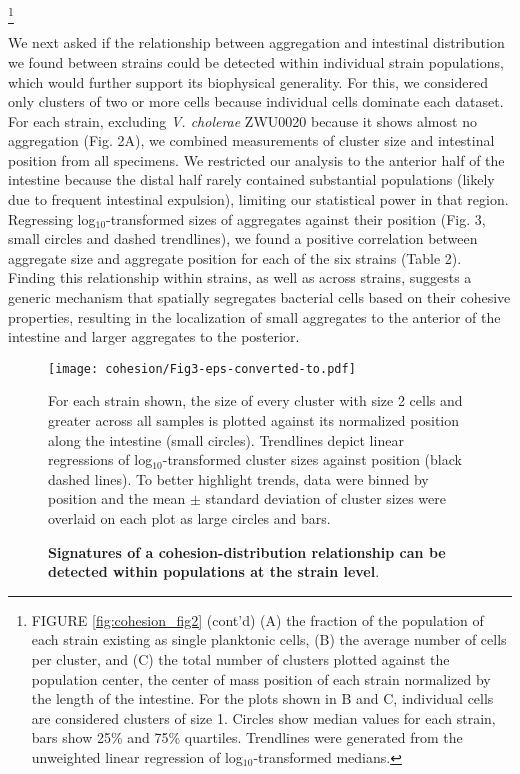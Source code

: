 {\let\thefootnote\relax\footnote{FIGURE \ref{fig:cohesion_fig2} (cont'd) (A) the fraction of the population of each strain existing as single planktonic cells, (B) the average number of cells per cluster, and (C) the total number of clusters plotted against the population center, the center of mass position of each strain normalized by the length of the intestine. For the plots shown in B and C, individual cells are considered clusters of size 1. Circles show median values for each strain, bars show 25\% and 75\% quartiles. Trendlines were generated from the unweighted linear regression of log$_{10}$-transformed medians.}

We next asked if the relationship between aggregation and intestinal distribution we found between strains could be detected within individual strain populations, which would further support its biophysical generality. For this, we considered only clusters of two or more cells because individual cells dominate each dataset. For each strain, excluding \textit{V. cholerae} ZWU0020 because it shows almost no aggregation (Fig. 2A), we combined measurements of cluster size and intestinal position from all specimens. We restricted our analysis to the anterior half of the intestine because the distal half rarely contained substantial populations (likely due to frequent intestinal expulsion), limiting our statistical power in that region. Regressing log$_{10}$-transformed sizes of aggregates against their position (Fig. 3, small circles and dashed trendlines), we found a positive correlation between aggregate size and aggregate position for each of the six strains (Table 2). Finding this relationship within strains, as well as across strains, suggests a generic mechanism that spatially segregates bacterial cells based on their cohesive properties, resulting in the localization of small aggregates to the anterior of the intestine and larger aggregates to the posterior.


\begin{figure}%
	\centerline{
		\texttt{[image: cohesion/Fig3-eps-converted-to.pdf]}}
	\caption{\textbf{Signatures of a cohesion-distribution relationship can be detected within populations at the strain level}.} { For each strain shown, the size of every cluster with size 2 cells and greater across all samples is plotted against its normalized position along the intestine (small circles). Trendlines depict linear regressions of log$_{10}$-transformed cluster sizes against position (black dashed lines). To better highlight trends, data were binned by position and the mean $\pm$ standard deviation of cluster sizes were overlaid on each plot as large circles and bars. }
\end{figure}
	
}
